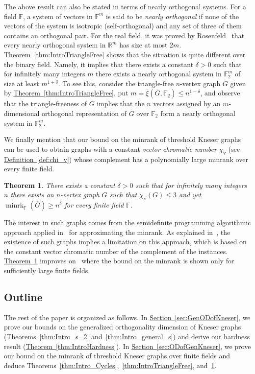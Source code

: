 \documentclass[11pt]{article}
\numberwithin{equation}{section}
\newtheorem{theorem}{Theorem}[section]
\theoremstyle{definition}
\theoremstyle{plain}
\newcommand{\R}{\mathbb R}
\newcommand{\expref}[2]{\hyperref[#2]{#1~\ref{#2}}}
\newcommand{\Fset}{\mathbb{F}}
\newcommand{\od}{\overline{\xi}}
\newcommand{\minrank}{\mathop{\mathrm{minrk}}}
\newcommand{\vchrom}{{\chi_\mathrm{v}}}
\begin{document}
The above result can also be stated in terms of nearly orthogonal systems.
For a field $\Fset$, a system of vectors in $\Fset^m$ is said to be \emph{nearly
orthogonal} if %
%
none of the vectors of the system is isotropic (self-orthogonal) %
and any set of three of them contains an orthogonal pair.
For the real field, it was proved by Rosenfeld~\cite{Rosenfeld91} that every nearly orthogonal system in $\R^m$ has size at most $2m$.
\expref{Theorem}{thm:IntroTriangleFree} shows that the situation is quite different over the binary field. Namely, it implies that there exists a constant $\delta>0$ such that for infinitely many integers $m$ there exists a nearly orthogonal system in $\Fset_2^m$ of size at least $m^{1+\delta}$.
To see this, consider the triangle-free $n$-vertex graph $G$ given by \expref{Theorem}{thm:IntroTriangleFree}, put $m = \od(\overline{G},\Fset_2) \leq n^{1-\delta}$, and observe that the triangle-freeness of $G$ implies that the $n$ vectors assigned by an $m$-dimensional orthogonal representation of $\overline{G}$ over $\Fset_2$ form a nearly orthogonal system in $\Fset_2^m$.

We finally mention that our bound on the minrank
%
%
%
of threshold Kneser graphs  %
can be used to obtain graphs with a constant \emph{vector chromatic number} $\vchrom$ (see \expref{Definition}{def:chi_v}) whose complement has a polynomially large minrank over every finite field.
\begin{theorem}\label{thm:Intro_chi_v}
There exists a constant $\delta >0$ such that for infinitely many integers $n$ there exists an $n$-vertex graph $G$ such that $\vchrom(G) \leq 3$ and yet $\minrank_{\Fset}(\overline{G}) \geq n^\delta$ for every finite field $\Fset$.
\end{theorem}
\noindent
The interest in such graphs comes from the semidefinite programming algorithmic approach applied in~\cite{ChlamtacH14} for approximating the minrank.
%
%
As explained in~\cite{Haviv18}, %
%
the existence of such graphs implies  %
a limitation on this approach, which is based on the constant vector chromatic number of the complement of the instances. \expref{Theorem}{thm:Intro_chi_v} improves on~\cite[Theorem~1.3]{Haviv18} where the bound on the minrank is shown only for sufficiently large finite fields.

\subsection{Outline}
The rest of the paper is organized as follows.
In \expref{Section}{sec:GenODofKneser}, we prove our bounds on the generalized orthogonality dimension
%
%
of Kneser graphs (Theorems~\ref{thm:Intro_s=2} and~\ref{thm:Intro_general_s}) and derive our hardness result (\expref{Theorem}{thm:IntroHardness}).
In \expref{Section}{sec:ODofGenKneser}, we prove our bound on the minrank
%
%
of threshold Kneser graphs  %
over finite fields  %
and deduce Theorems~\ref{thm:Intro_Cycles},~\ref{thm:IntroTriangleFree}, and~\ref{thm:Intro_chi_v}.
\end{document}
